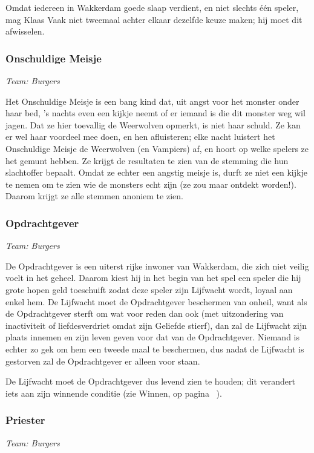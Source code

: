 \documentclass[12pt]{article}
\begin{document}
      Omdat iedereen in Wakkerdam goede slaap verdient, en niet slechts \'e\'en speler, mag Klaas Vaak niet tweemaal achter elkaar dezelfde keuze maken; hij moet dit afwisselen.
    
    \subsubsection{Onschuldige Meisje}
      \emph{\scriptsize Team: Burgers}
    
      Het Onschuldige Meisje is een bang kind dat, uit angst voor het monster onder haar bed, 's nachts even een kijkje neemt of er iemand is die dit monster weg wil jagen. Dat ze hier toevallig de Weerwolven opmerkt, is niet haar schuld. Ze kan er wel haar voordeel mee doen, en hen afluisteren; elke nacht luistert het Onschuldige Meisje de Weerwolven (en Vampiers) af, en hoort op welke spelers ze het gemunt hebben. Ze krijgt de resultaten te zien van de stemming die hun slachtoffer bepaalt. Omdat ze echter een angstig meisje is, durft ze niet een kijkje te nemen om te zien wie de monsters echt zijn (ze zou maar ontdekt worden!). Daarom krijgt ze alle stemmen anoniem te zien.
    
    \subsubsection{Opdrachtgever}
      \emph{\scriptsize Team: Burgers}
    
      De Opdrachtgever is een uiterst rijke inwoner van Wakkerdam, die zich niet veilig voelt in het geheel. Daarom kiest hij in het begin van het spel een speler die hij grote hopen geld toeschuift zodat deze speler zijn Lijfwacht wordt, loyaal aan enkel hem. De Lijfwacht moet de Opdrachtgever beschermen van onheil, want als de Opdrachtgever sterft om wat voor reden dan ook (met uitzondering van inactiviteit of liefdesverdriet omdat zijn Geliefde stierf), dan zal de Lijfwacht zijn plaats innemen en zijn leven geven voor dat van de Opdrachtgever. Niemand is echter zo gek om hem een tweede maal te beschermen, dus nadat de Lijfwacht is gestorven zal de Opdrachtgever er alleen voor staan.
    
      De Lijfwacht moet de Opdrachtgever dus levend zien te houden; dit verandert iets aan zijn winnende conditie (zie Winnen, op pagina~\pageref{subsec:winnen} ).
    
    \subsubsection{Priester}
      \emph{\scriptsize Team: Burgers}
    
\end{document}
